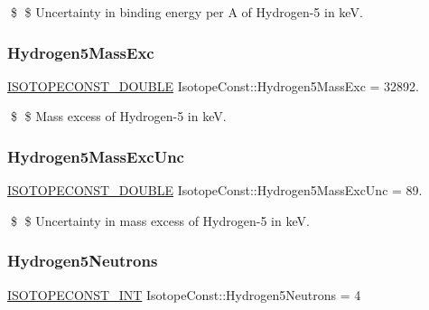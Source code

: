 \$ \$ Uncertainty in binding energy per A of Hydrogen-\/5 in keV. \mbox{\label{group___isotope_const-_hydrogen-_h5_ga760c2945a9ee1d4d2fe198eaa1c2e794}} 
\subsubsection{\texorpdfstring{Hydrogen5\+Mass\+Exc}{Hydrogen5MassExc}}
{\footnotesize\ttfamily \mbox{\hyperlink{group___isotope_const-_macros_ga8f45a7272ce02c0b4c65c44636ed719a}{I\+S\+O\+T\+O\+P\+E\+C\+O\+N\+S\+T\+\_\+\+D\+O\+U\+B\+LE}} Isotope\+Const\+::\+Hydrogen5\+Mass\+Exc = 32892.}

\$ \$ Mass excess of Hydrogen-\/5 in keV. \mbox{\label{group___isotope_const-_hydrogen-_h5_gaee4efc759ddcb3872db1a63ff5d3a534}} 
\subsubsection{\texorpdfstring{Hydrogen5\+Mass\+Exc\+Unc}{Hydrogen5MassExcUnc}}
{\footnotesize\ttfamily \mbox{\hyperlink{group___isotope_const-_macros_ga8f45a7272ce02c0b4c65c44636ed719a}{I\+S\+O\+T\+O\+P\+E\+C\+O\+N\+S\+T\+\_\+\+D\+O\+U\+B\+LE}} Isotope\+Const\+::\+Hydrogen5\+Mass\+Exc\+Unc = 89.}

\$ \$ Uncertainty in mass excess of Hydrogen-\/5 in keV. \mbox{\label{group___isotope_const-_hydrogen-_h5_ga56a5011302e6d29fd8c42faffaaf0248}} 
\subsubsection{\texorpdfstring{Hydrogen5\+Neutrons}{Hydrogen5Neutrons}}
{\footnotesize\ttfamily \mbox{\hyperlink{group___isotope_const-_macros_ga5f18360b3e99483a35c32d789e62621c}{I\+S\+O\+T\+O\+P\+E\+C\+O\+N\+S\+T\+\_\+\+I\+NT}} Isotope\+Const\+::\+Hydrogen5\+Neutrons = 4}

